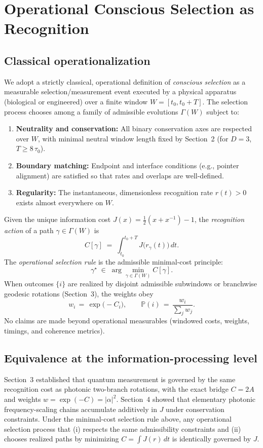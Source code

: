 \documentclass[12pt,a4paper]{article}
\begin{document}
\section{Operational Conscious Selection as Recognition}

\subsection{Classical operationalization}
We adopt a strictly classical, operational definition of \emph{conscious selection} as a measurable selection/measurement event executed by a physical apparatus (biological or engineered) over a finite window $W=[t_{0},t_{0}+T]$. The selection process chooses among a family of admissible evolutions $\Gamma(W)$ subject to:
\begin{enumerate}
  \item \textbf{Neutrality and conservation:} All binary conservation axes are respected over $W$, with minimal neutral window length fixed by Section~2 (for $D=3$, $T\ge 8\,\tau_{0}$).
  \item \textbf{Boundary matching:} Endpoint and interface conditions (e.g., pointer alignment) are satisfied so that rates and overlaps are well-defined.
  \item \textbf{Regularity:} The instantaneous, dimensionless recognition rate $r(t)>0$ exists almost everywhere on $W$.
\end{enumerate}
Given the unique information cost $J(x)=\tfrac{1}{2}(x+x^{-1})-1$, the \emph{recognition action} of a path $\gamma\in\Gamma(W)$ is
\[
  C[\gamma] \;=\; \int_{t_{0}}^{t_{0}+T} J\!\bigl(r_{\gamma}(t)\bigr)\,dt.
\]
The \emph{operational selection rule} is the admissible minimal-cost principle:
\[
  \gamma^{\star} \;\in\; \arg\min_{\gamma\in\Gamma(W)} C[\gamma].
\]
When outcomes $\{i\}$ are realized by disjoint admissible subwindows or branchwise geodesic rotations (Section~3), the weights obey
\[
  w_i \,=\, \exp\!\bigl(-C_i\bigr),
  \qquad
  \mathbb{P}(i) \,=\, \frac{w_i}{\sum_j w_j}.
\]
No claims are made beyond operational measurables (windowed costs, weights, timings, and coherence metrics).

\subsection{Equivalence at the information-processing level}
Section~3 established that quantum measurement is governed by the same recognition cost as photonic two-branch rotations, with the exact bridge $C=2A$ and weights $w=\exp(-C)=|\alpha|^{2}$. Section~4 showed that elementary photonic frequency-scaling chains accumulate additively in $J$ under conservation constraints. Under the minimal-cost selection rule above, any operational selection process that (i) respects the same admissibility constraints and (ii) chooses realized paths by minimizing $C=\int J(r)\,dt$ is identically governed by $J$.
\end{document}
